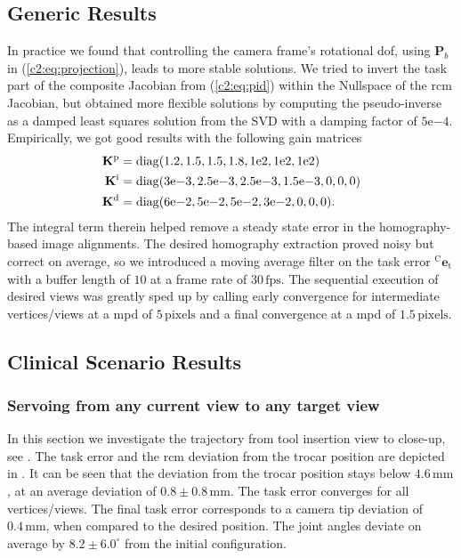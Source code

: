 \subsection{Generic Results}
\label{c2:sec:generic_res}
In practice we found that controlling the camera frame's rotational \gls{dof}, using $\mathbf{P}_b$ in (\eqref{c2:eq:projection}), leads to more stable solutions. We tried to invert the task part of the composite Jacobian from (\eqref{c2:eq:pid}) within the Nullspace of the \gls{rcm} Jacobian, but obtained more flexible solutions by computing the pseudo-inverse as a damped least squares solution from the SVD with a damping factor of $5\mathrm{e}{-4}$. Empirically, we got good results with the following gain matrices
\begin{equation*}
    \begin{split}
        \mathbf{K}^\text{p} &= \operatorname{diag}(1.2, 1.5, 1.5, 1.8, 1\mathrm{e}{2}, 1\mathrm{e}{2}, 1\mathrm{e}{2}) \\
        \mathbf{K}^\text{i} &= \operatorname{diag}(3\mathrm{e}{-3}, 2.5\mathrm{e}{-3},2.5\mathrm{e}{-3}, 1.5\mathrm{e}{-3}, 0, 
    0, 0)\\
        \mathbf{K}^\text{d} &= \operatorname{diag}(6\mathrm{e}{-2}, 5\mathrm{e}{-2}, 5\mathrm{e}{-2}, 3\mathrm{e}{-2}, 0, 0, 0).
    \end{split}
\end{equation*}
The integral term therein helped remove a steady state error in the homography-based image alignments. The desired homography extraction proved noisy but correct on average, so we introduced a moving average filter on the task error $^\text{C}\mathbf{e}_\text{t}$ with a buffer length of $10$ at a frame rate of $30\,\text{fps}$. The sequential execution of desired views was greatly sped up by calling early convergence for intermediate vertices/views at a \gls{mpd} of $5\,\text{pixels}$ and a final convergence at a \gls{mpd} of $1.5\,\text{pixels}$. 

\subsection{Clinical Scenario Results}
\label{c2:sec:clin_res}
\subsubsection{Servoing from any current view to any target view}
\label{c2:sec:clin_res_any}

In this section we investigate the trajectory from tool insertion view to close-up, see . The task error and the \gls{rcm} deviation from the trocar position are depicted in . It can be seen that the deviation from the trocar position stays below $4.6\,\text{mm}$, at an average deviation of $0.8\pm0.8\,\text{mm}$. The task error converges for all vertices/views. The final task error corresponds to a camera tip deviation of $0.4\,\text{mm}$, when compared to the desired position. The joint angles deviate on average by $8.2\pm6.0^\circ$ from the initial configuration.

